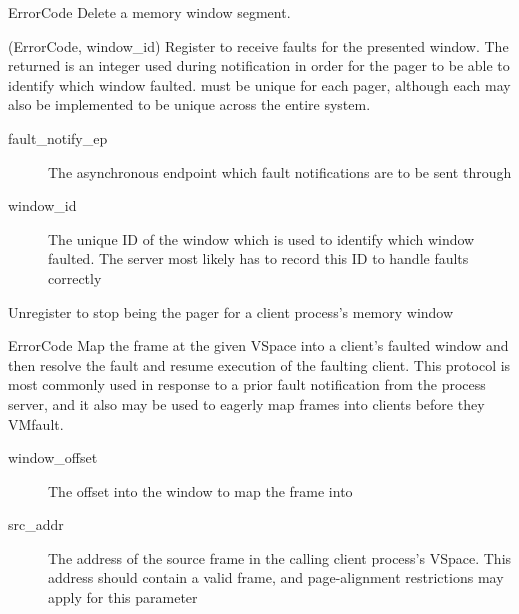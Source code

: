 \begin{description}
    \item {}
        {ErrorCode}
    Delete a memory window segment.

	\item {} 
	   {(ErrorCode, window\_id)} 
    Register to receive faults for the presented window. The returned  is an integer used during notification in order for the pager to be able to identify which window faulted.  must be unique for each pager, although each  may also be implemented to be unique across the entire system.
    \begin{description}
        \item [fault\_notify\_ep] The asynchronous endpoint which fault notifications are to be sent through
        \item [window\_id] The unique ID of the window which is used to identify which window faulted. The server most likely has to record this ID to handle faults correctly
    \end{description}

    \item {} 
    Unregister to stop being the pager for a client process's memory window

	\item {}
	   {ErrorCode}
	Map the frame at the given VSpace into a client's faulted window and then resolve the fault and resume execution of the faulting client. This protocol is most commonly used in response to a prior fault notification from the process server, and it also may be used to eagerly map frames into clients before they VMfault.
    \begin{description}
        \item [window\_offset] The offset into the window to map the frame into
        \item [src\_addr] The address of the source frame in the calling client process's VSpace. This address should contain a valid frame, and page-alignment restrictions may apply for this parameter
    \end{description}
	

\end{description}
